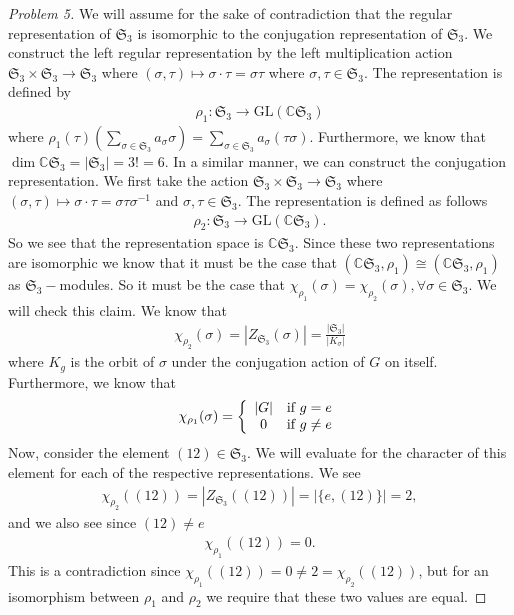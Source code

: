 \documentclass[titlepage]{article}
\theoremstyle{plain}
\theoremstyle{definition}
\theoremstyle{remark}
\theoremstyle{exercise-style}
\numberwithin{equation}{section}
\numberwithin{theorem}{section}
\numberwithin{remark}{section}
\begin{document}
\begin{proof}[Problem 5]
    We will assume for the sake of contradiction that the regular representation of $\mathfrak{S}_3$ is isomorphic to the conjugation representation of $\mathfrak{S}_3$. We construct the left regular representation by the left multiplication action $\mathfrak{S}_3 \times \mathfrak{S}_3 \to \mathfrak{S}_3$ where $(\sigma,\tau) \mapsto \sigma \cdot \tau = \sigma \tau$ where $\sigma, \tau \in \mathfrak{S}_3$. The representation is defined by
    \begin{align}
        \rho_1 : \mathfrak{S}_3 \to \mathrm{GL}(\mathbb{C}\mathfrak{S}_3)
    \end{align}
    where $\rho_1(\tau)\left ( \sum_{\sigma \in \mathfrak{S}_3}a_\sigma \sigma \right ) = \sum_{\sigma \in \mathfrak{S}_3}a_\sigma (\tau \sigma)$. Furthermore, we know that $\dim \mathbb{C}\mathfrak{S}_3 = |\mathfrak{S}_3| = 3! = 6$. In a similar manner, we can construct the conjugation representation. We first take the action $\mathfrak{S}_3 \times \mathfrak{S}_3 \to \mathfrak{S}_3$ where $(\sigma,\tau) \mapsto \sigma \cdot \tau = \sigma \tau \sigma^{-1}$ and $\sigma, \tau \in \mathfrak{S}_3$. The representation is defined as follows
    \begin{align}
        \rho_2 : \mathfrak{S}_3 \to \mathrm{GL}(\mathbb{C}\mathfrak{S}_3).
    \end{align}
    So we see that the representation space is $\mathbb{C}\mathfrak{S}_3$. Since these two representations are isomorphic we know that it must be the case that $(\mathbb{C}\mathfrak{S}_3, \rho_1) \cong (\mathbb{C}\mathfrak{S}_3, \rho_1)$ as $\mathfrak{S}_3-$modules. So it must be the case that $\chi_{\rho_1}(\sigma) = \chi_{\rho_2}(\sigma), \forall \sigma \in \mathfrak{S}_3$. We will check this claim. We know that
    \begin{align}
        \chi_{\rho_2}(\sigma) = |Z_{\mathfrak{S}_3}(\sigma)| = \frac{|\mathfrak{S}_3|}{|K_\sigma|} 
    \end{align}
    where $K_g$ is the orbit of $\sigma$ under the conjugation action of $G$ on itself. Furthermore, we know that 
    \begin{align}
        \chi_{\rho_1}(\sigma) = \left \{ \begin{array}{cc}
           |G|  & \textnormal{if } g = e\\
            0   & \textnormal{if } g \neq e
        \end{array} \right .
    \end{align}
    Now, consider the element $(12) \in \mathfrak{S}_3$. We will evaluate for the character of this element for each of the respective representations. We see
    \begin{align}
        \chi_{\rho_2}((12)) = |Z_{\mathfrak{S}_3}((12))| = |\{ e, (12)\}| = 2,
    \end{align}
    and we also see since $(12) \neq e$
    \begin{align}
        \chi_{\rho_1}((12)) = 0.
    \end{align}
    This is a contradiction since $\chi_{\rho_1}((12)) = 0 \neq 2 = \chi_{\rho_2}((12))$, but for an isomorphism between $\rho_1$ and $\rho_2$ we require that these two values are equal.
\end{proof}
\end{document}
